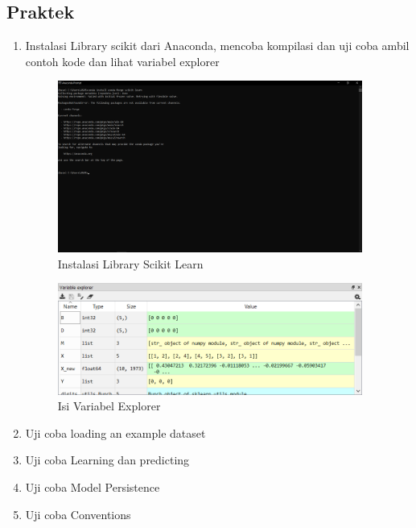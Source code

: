 \subsection{Praktek}
\begin{enumerate}
	\item Instalasi Library scikit dari Anaconda, mencoba kompilasi dan uji coba ambil contoh kode dan lihat variabel explorer
	\hfill\break
	\begin{figure}[h]
		\includegraphics[width=10cm]{figures/1184049/1.png}
		\centering
		\caption{Instalasi Library Scikit Learn}
	\end{figure}
	\begin{figure}[h]
		\includegraphics[width=10cm]{figures/1184049/VAR.png}
		\centering
		\caption{Isi Variabel Explorer}
	\end{figure}
	\newpage\item Uji coba loading an example dataset
	\hfill\break

\item Uji coba Learning dan predicting
	\hfill\break
	
\item Uji coba Model Persistence
	\hfill\break
	
	\item Uji coba Conventions
	\hfill\break
	
	\end{enumerate}
